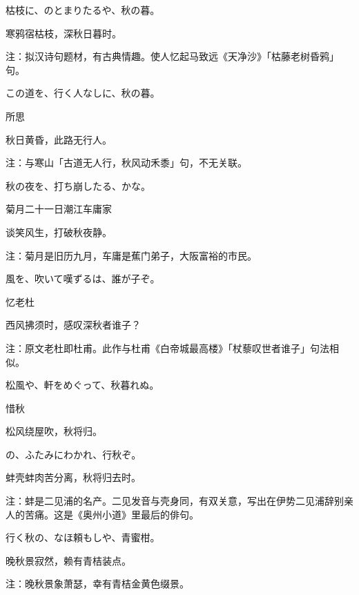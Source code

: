 \begin{haiku}
    {\FH 枯枝に、のとまりたるや、秋の暮。}

    {\FK 寒鸦宿枯枝，深秋日暮时。}

    {\FT 注：拟汉诗句题材，有古典情趣。使人忆起马致远《天净沙》「枯藤老树昏鸦」句。}
\end{haiku}

\begin{haiku}
    {\FH この道を、行く人なしに、秋の暮。}

    {\FK 所思}

    {\FK 秋日黄昏，此路无行人。}

    {\FT 注：与寒山「古道无人行，秋风动禾黍」句，不无关联。}
\end{haiku}

\begin{haiku}
    {\FH 秋の夜を、打ち崩したる、かな。}

    {\FK 菊月二十一日潮江车庸家}

    {\FK 谈笑风生，打破秋夜静。}

    {\FT 注：菊月是旧历九月，车庸是蕉门弟子，大阪富裕的市民。}
\end{haiku}

\begin{haiku}
    {\FH {}風を、吹いて嘆ずるは、誰が子ぞ。}

    {\FK 忆老杜}

    {\FK 西风拂须时，感叹深秋者谁子？}

    {\FT 注：原文老杜即杜甫。此作与杜甫《白帝城最高楼》「杖藜叹世者谁子」句法相似。}
\end{haiku}

\begin{haiku}
    {\FH 松風や、軒をめぐって、秋暮れぬ。}

    {\FK 惜秋}

    {\FK 松风绕屋吹，秋将归。}
\end{haiku}

\begin{haiku}
    {\FH {}の、ふたみにわかれ、行秋ぞ。}

    {\FK 蚌壳蚌肉苦分离，秋将归去时。}

    {\FT 注：蚌是二见浦的名产。二见发音与壳身同，有双关意，写出在伊势二见浦辞别亲人的苦痛。这是《奥州小道》里最后的俳句。}
\end{haiku}

\begin{haiku}
    {\FH 行く秋の、なほ頼もしや、青蜜柑。}

    {\FK 晚秋景寂然，赖有青桔装点。
    }

    {\FT 注：晚秋景象萧瑟，幸有青桔金黄色缀景。}
\end{haiku}

